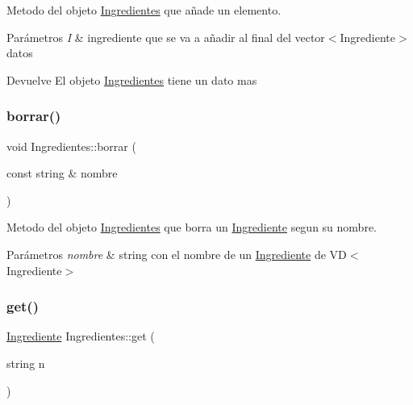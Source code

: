Metodo del objeto \hyperlink{classIngredientes}{Ingredientes} que añade un elemento. 


\begin{DoxyParams}{Parámetros}
{\em I} & ingrediente que se va a añadir al final del vector$<$\+Ingrediente$>$ datos \\
\hline
\end{DoxyParams}
\begin{DoxyReturn}{Devuelve}
El objeto \hyperlink{classIngredientes}{Ingredientes} tiene un dato mas 
\end{DoxyReturn}
\mbox{\label{classIngredientes_af3fa6c08d9fea867c2f4dd3efad4223c}} 
\subsubsection{\texorpdfstring{borrar()}{borrar()}}
{\footnotesize\ttfamily void Ingredientes\+::borrar (\begin{DoxyParamCaption}\item[{const string \&}]{nombre }\end{DoxyParamCaption})}



Metodo del objeto \hyperlink{classIngredientes}{Ingredientes} que borra un \hyperlink{classIngrediente}{Ingrediente} segun su nombre. 


\begin{DoxyParams}{Parámetros}
{\em nombre} & string con el nombre de un \hyperlink{classIngrediente}{Ingrediente} de V\+D$<$\+Ingrediente$>$ \\
\hline
\end{DoxyParams}
\mbox{\label{classIngredientes_a1eddfac49913e486490721f6c114bf30}} 
\subsubsection{\texorpdfstring{get()}{get()}}
{\footnotesize\ttfamily \hyperlink{classIngrediente}{Ingrediente} Ingredientes\+::get (\begin{DoxyParamCaption}\item[{string}]{n }\end{DoxyParamCaption})}



